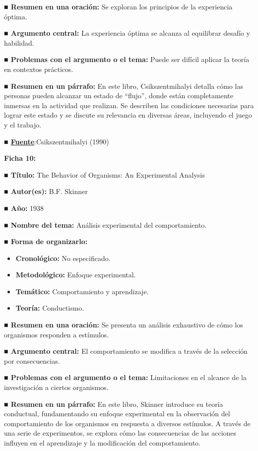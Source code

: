 \documentclass[
  letterpaper,
  DIV=11,
  numbers=noendperiod]{scrreprt}
\begin{document}
\textbf{■ Resumen en una oración:} Se exploran los principios de la
experiencia óptima.

\textbf{■ Argumento central:} La experiencia óptima se alcanza al
equilibrar desafío y habilidad.

\textbf{■ Problemas con el argumento o el tema:} Puede ser difícil
aplicar la teoría en contextos prácticos.

\textbf{■ Resumen en un párrafo:} En este libro, Csikszentmihalyi
detalla cómo las personas pueden alcanzar un estado de ``flujo'', donde
están completamente inmersas en la actividad que realizan. Se describen
las condiciones necesarias para lograr este estado y se discute su
relevancia en diversas áreas, incluyendo el juego y el trabajo.

\textbf{■
\href{https://en.wikipedia.org/wiki/Flow_(psychology)}{Fuente}}:Csikszentmihalyi
(1990)

\textbf{Ficha 10:}

\textbf{■ Título:} The Behavior of Organisms: An Experimental Analysis

\textbf{■ Autor(es):} B.F. Skinner

\textbf{■ Año:} 1938

\textbf{■ Nombre del tema:} Análisis experimental del comportamiento.

\textbf{■ Forma de organizarlo:}

\begin{itemize}
\item
  \textbf{Cronológico:} No especificado.
\item
  \textbf{Metodológico:} Enfoque experimental.
\item
  \textbf{Temático:} Comportamiento y aprendizaje.
\item
  \textbf{Teoría:} Conductismo.
\end{itemize}

\textbf{■ Resumen en una oración:} Se presenta un análisis exhaustivo de
cómo los organismos responden a estímulos.

\textbf{■ Argumento central:} El comportamiento se modifica a través de
la selección por consecuencias.

\textbf{■ Problemas con el argumento o el tema:} Limitaciones en el
alcance de la investigación a ciertos organismos.

\textbf{■ Resumen en un párrafo:} En este libro, Skinner introduce su
teoría conductual, fundamentando su enfoque experimental en la
observación del comportamiento de los organismos en respuesta a diversos
estímulos. A través de una serie de experimentos, se explora cómo las
consecuencias de las acciones influyen en el aprendizaje y la
modificación del comportamiento.
\end{document}
